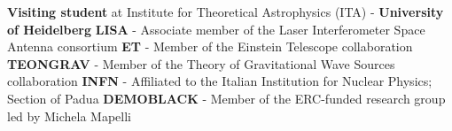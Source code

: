 %
%
%


\begin{singlelines}
					{\textbf{Visiting student} at Institute for Theoretical Astrophysics (ITA) - \textbf{University of Heidelberg}}{}
					{\textbf{LISA} - Associate member of the Laser Interferometer Space Antenna consortium}	{}
					{\textbf{ET} - Member of the Einstein Telescope collaboration}{}
					{\textbf{TEONGRAV} - Member of the Theory of Gravitational Wave Sources collaboration}{}
					{\textbf{INFN}	- Affiliated to the Italian Institution for Nuclear Physics; Section of Padua}{}
					{\textbf{DEMOBLACK} - Member of the ERC-funded research group led by Michela Mapelli }{}
\end{singlelines}
\medskip